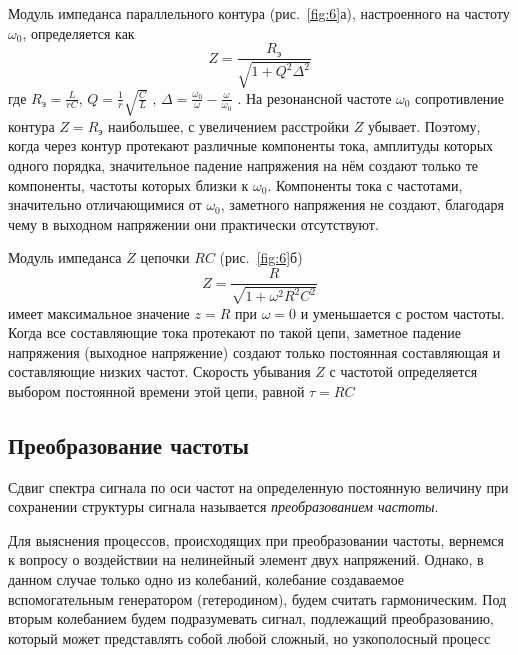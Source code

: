 Модуль импеданса параллельного контура (рис.~\ref{fig:6}а), настроенного на частоту $\omega_0$, определяется как
$$ Z=\frac{R_{\text{э}}}{\sqrt{1+Q^2\Delta^2}} $$
где $ R_{\text{э}} = \frac{L}{rC} $, $ Q = \frac{1}{r}\sqrt{\frac{C}{L}} $ , $ \Delta = \frac{\omega_0}{\omega}-\frac{\omega}{\omega_0} $ . На резонансной частоте $\omega_0$ сопротивление контура $Z = R_{\text{э}}$ наибольшее, с увеличением расстройки $Z$ убывает. Поэтому, когда через контур протекают различные компоненты тока, амплитуды которых одного порядка, значительное падение напряжения на нём создают только те компоненты, частоты которых близки к $\omega_0$. Компоненты тока с частотами, значительно отличающимися от
$\omega_0$, заметного напряжения не создают, благодаря чему в выходном напряжении они практически отсутствуют.

Модуль импеданса $Z$ цепочки $RC$ (рис.~\ref{fig:6}б)
$$ Z=\frac{R}{\sqrt{1+\omega^2R^2C^2}} $$
имеет максимальное значение $z = R$ при $\omega = 0$ и уменьшается с ростом частоты. Когда все составляющие тока протекают по такой цепи, заметное падение напряжения (выходное напряжение) создают только постоянная составляющая и составляющие низких частот. Скорость убывания $Z$ с частотой определяется выбором постоянной времени этой цепи, равной $\tau = RC$
\subsection{Преобразование частоты}
Сдвиг спектра сигнала по оси частот на определенную постоянную величину при сохранении структуры сигнала называется \textit{преобразованием частоты}.

Для выяснения процессов, происходящих при преобразовании частоты, вернемся к вопросу о воздействии на нелинейный элемент двух напряжений. Однако, в данном случае только одно из колебаний, колебание создаваемое вспомогательным генератором (гетеродином), будем считать гармоническим. Под вторым колебанием
будем подразумевать сигнал, подлежащий преобразованию, который может представлять собой любой сложный, но узкополосный процесс

